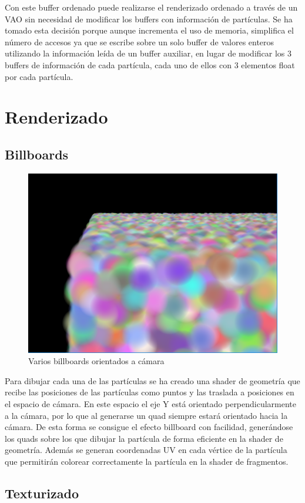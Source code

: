 \documentclass[10pt,oneside,a4paper]{article}
\begin{document}
Con este buffer ordenado puede realizarse el renderizado ordenado a través de un VAO sin necesidad de modificar los buffers con información de partículas. Se ha tomado esta decisión porque aunque incrementa el uso de memoria, simplifica el número de accesos ya que se escribe sobre un solo buffer de valores enteros utilizando la información leída de un buffer auxiliar, en lugar de modificar los 3 buffers de información de cada partícula, cada uno de ellos con 3 elementos float por cada partícula.

\section{Renderizado}
\subsection{Billboards}
\begin{figure}[h!tbp]
\centering
\includegraphics[width=.8\linewidth]{img/billboards.png}
\caption{Varios billboards orientados a cámara}
\end{figure}
Para dibujar cada una de las partículas se ha creado una shader de geometría que recibe las posiciones de las partículas como puntos y las traslada a posiciones en el espacio de cámara. En este espacio el eje Y está orientado perpendicularmente a la cámara, por lo que al generarse un quad siempre estará orientado hacia la cámara. De esta forma se consigue el efecto billboard con facilidad, generándose los quads sobre los que dibujar la partícula de forma eficiente en la shader de geometría. Además se generan coordenadas UV en cada vértice de la partícula que permitirán colorear correctamente la partícula en la shader de fragmentos.

\subsection{Texturizado}
\end{document}
